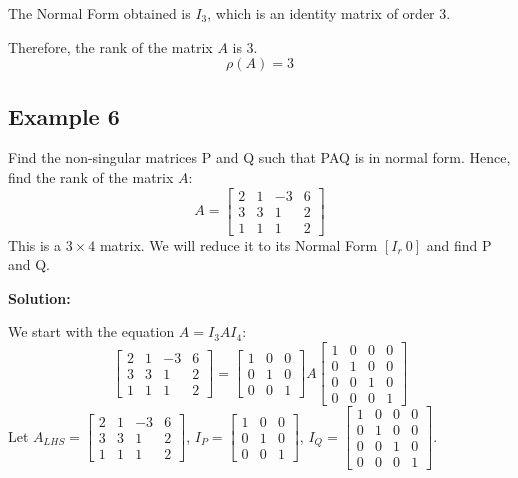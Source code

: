 \documentclass{article}
\begin{document}
The Normal Form obtained is $I_3$, which is an identity matrix of order 3.

Therefore, the rank of the matrix $A$ is 3.
\[ \rho(A) = 3 \]

\subsection{Example 6}
Find the non-singular matrices P and Q such that PAQ is in normal form. Hence, find the rank of the matrix $A$:
\[ A = \begin{bmatrix} 2 & 1 & -3 & 6 \\ 3 & 3 & 1 & 2 \\ 1 & 1 & 1 & 2 \end{bmatrix} \]
This is a $3 \times 4$ matrix. We will reduce it to its Normal Form $[I_r \ 0]$ and find P and Q.

\textbf{Solution:}

We start with the equation $A = I_3 A I_4$:
\[ \begin{bmatrix} 2 & 1 & -3 & 6 \\ 3 & 3 & 1 & 2 \\ 1 & 1 & 1 & 2 \end{bmatrix} = \begin{bmatrix} 1 & 0 & 0 \\ 0 & 1 & 0 \\ 0 & 0 & 1 \end{bmatrix} A \begin{bmatrix} 1 & 0 & 0 & 0 \\ 0 & 1 & 0 & 0 \\ 0 & 0 & 1 & 0 \\ 0 & 0 & 0 & 1 \end{bmatrix} \]
Let $A_{LHS} = \begin{bmatrix} 2 & 1 & -3 & 6 \\ 3 & 3 & 1 & 2 \\ 1 & 1 & 1 & 2 \end{bmatrix}$, $I_P = \begin{bmatrix} 1 & 0 & 0 \\ 0 & 1 & 0 \\ 0 & 0 & 1 \end{bmatrix}$, $I_Q = \begin{bmatrix} 1 & 0 & 0 & 0 \\ 0 & 1 & 0 & 0 \\ 0 & 0 & 1 & 0 \\ 0 & 0 & 0 & 1 \end{bmatrix}$.
\end{document}
